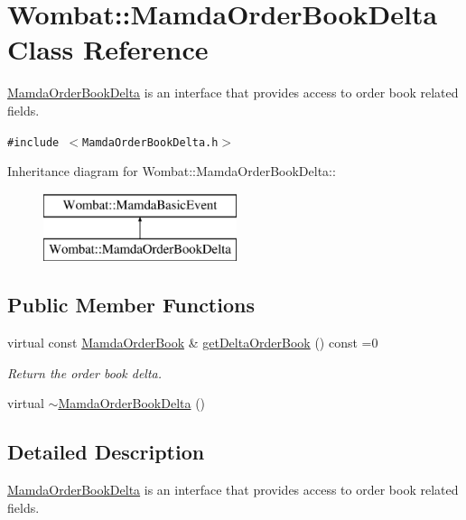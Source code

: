 \hypertarget{classWombat_1_1MamdaOrderBookDelta}{
\section{Wombat::Mamda\-Order\-Book\-Delta Class Reference}
\label{classWombat_1_1MamdaOrderBookDelta}
}
\hyperlink{classWombat_1_1MamdaOrderBookDelta}{Mamda\-Order\-Book\-Delta} is an interface that provides access to order book related fields.  


{\tt \#include $<$Mamda\-Order\-Book\-Delta.h$>$}

Inheritance diagram for Wombat::Mamda\-Order\-Book\-Delta::\begin{figure}[H]
\begin{center}
\leavevmode
\includegraphics[height=2cm]{classWombat_1_1MamdaOrderBookDelta}
\end{center}
\end{figure}
\subsection*{Public Member Functions}
\begin{CompactItemize}
\item 
virtual const \hyperlink{classWombat_1_1MamdaOrderBook}{Mamda\-Order\-Book} \& \hyperlink{classWombat_1_1MamdaOrderBookDelta_4bd9e50ba3d3131925d4d200a9ab60ab}{get\-Delta\-Order\-Book} () const =0
\begin{CompactList}\small\item\em Return the order book delta. \item\end{CompactList}\item 
virtual \hyperlink{classWombat_1_1MamdaOrderBookDelta_a10bb01dfd7807dc9ebf21080798b357}{$\sim$Mamda\-Order\-Book\-Delta} ()
\end{CompactItemize}


\subsection{Detailed Description}
\hyperlink{classWombat_1_1MamdaOrderBookDelta}{Mamda\-Order\-Book\-Delta} is an interface that provides access to order book related fields. 



